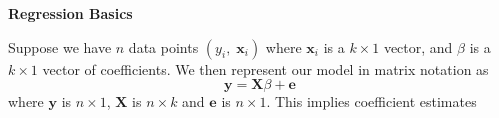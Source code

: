 \documentclass[a4paper,12pt]{scrartcl}
\author{Matthew Cocci}
\title{}
\date{\today}
\begin{document}
\begin{center}
    \LARGE
    \textbf{Regression Basics}
\end{center}

Suppose we have $n$ data points $(y_i, \; \mathbf{x}_i)$ where 
$\mathbf{x}_i$ is a $k\times1$ vector, and 
$\beta$ is a $k \times 1$ vector of coefficients.
We then represent our model in matrix notation as 
\begin{equation}
    \mathbf{y} = \mathbf{X} \beta + \mathbf{e}
\end{equation}
where $\mathbf{y}$ is $n \times 1$, $\mathbf{X}$ is 
$n\times k$ and $\mathbf{e}$ is $n\times 1$.  This
implies coefficient estimates 



\appendix
\end{document}
